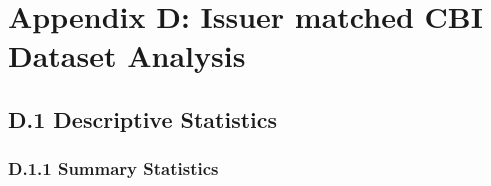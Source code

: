 %
%

\chapter{Appendix D: Issuer matched CBI Dataset Analysis}
\label{appD}

\section{D.1 Descriptive Statistics}


\subsection{D.1.1 Summary Statistics}


